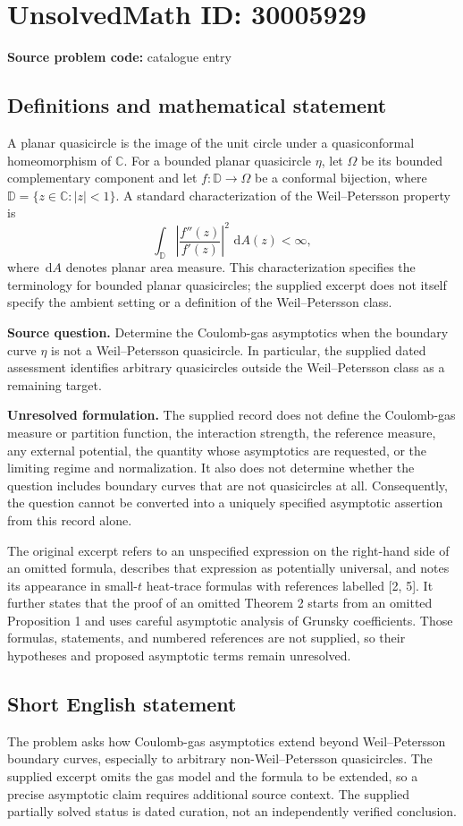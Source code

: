 \documentclass[11pt]{article}
\newcommand{\C}{\mathbb{C}}
\newcommand{\dd}{\,\mathrm{d}}
\begin{document}
\section*{UnsolvedMath ID: 30005929}
\textbf{Source problem code:} catalogue entry
\subsection{Definitions and mathematical statement}
A planar quasicircle is the image of the unit circle under a quasiconformal homeomorphism of \(\C\). For a bounded planar quasicircle \(\eta\), let \(\Omega\) be its bounded complementary component and let \(f:\mathbb D\to\Omega\) be a conformal bijection, where \(\mathbb D=\{z\in\C:|z|<1\}\). A standard characterization of the Weil--Petersson property is
\[
\int_{\mathbb D}\left|\frac{f''(z)}{f'(z)}\right|^2\,\dd A(z)<\infty,
\]
where \(\dd A\) denotes planar area measure. This characterization specifies the terminology for bounded planar quasicircles; the supplied excerpt does not itself specify the ambient setting or a definition of the Weil--Petersson class.

\textbf{Source question.} Determine the Coulomb-gas asymptotics when the boundary curve \(\eta\) is not a Weil--Petersson quasicircle. In particular, the supplied dated assessment identifies arbitrary quasicircles outside the Weil--Petersson class as a remaining target.

\textbf{Unresolved formulation.} The supplied record does not define the Coulomb-gas measure or partition function, the interaction strength, the reference measure, any external potential, the quantity whose asymptotics are requested, or the limiting regime and normalization. It also does not determine whether the question includes boundary curves that are not quasicircles at all. Consequently, the question cannot be converted into a uniquely specified asymptotic assertion from this record alone.

The original excerpt refers to an unspecified expression on the right-hand side of an omitted formula, describes that expression as potentially universal, and notes its appearance in small-\(t\) heat-trace formulas with references labelled [2, 5]. It further states that the proof of an omitted Theorem 2 starts from an omitted Proposition 1 and uses careful asymptotic analysis of Grunsky coefficients. Those formulas, statements, and numbered references are not supplied, so their hypotheses and proposed asymptotic terms remain unresolved.
\subsection{Short English statement}
The problem asks how Coulomb-gas asymptotics extend beyond Weil--Petersson boundary curves, especially to arbitrary non-Weil--Petersson quasicircles. The supplied excerpt omits the gas model and the formula to be extended, so a precise asymptotic claim requires additional source context. The supplied partially solved status is dated curation, not an independently verified conclusion.
\end{document}
